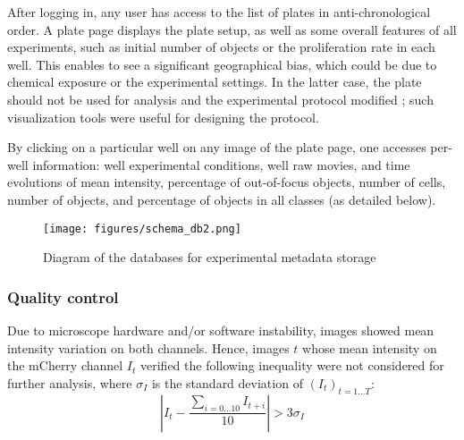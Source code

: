 After logging in, any user has access to the list of plates in anti-chronological order. A plate page displays the plate setup, as well as some overall features of all experiments, such as initial number of objects or the proliferation rate in each well. This enables to see a significant geographical bias, which could be due to chemical exposure or the experimental settings. In the latter case, the plate should not be used for analysis and the experimental protocol modified ; such visualization tools were useful for designing the protocol. 

By clicking on a particular well on any image of the plate page, one accesses per-well information: well experimental conditions, well raw movies, and time evolutions of mean intensity, percentage of out-of-focus objects, number of cells, number of objects, and percentage of objects in all classes (as detailed below).

\begin{figure}
\centering
\texttt{[image: figures/schema\_db2.png]}
\caption{Diagram of the databases for experimental metadata storage}
\label{db}
\end{figure}


\subsubsection{Quality control}
Due to microscope hardware and/or software instability, images showed mean intensity variation on both channels. Hence, images $t$ whose mean intensity on the mCherry channel $I_t$ verified the following inequality were not considered for further analysis, where $\sigma_I $ is the standard deviation of $(I_t)_{t=1\ldots T}$:
\[ |I_t- \dfrac{\sum_{i=0\ldots 10} I_{t+i} }{10}| > 3\sigma_I  \]

